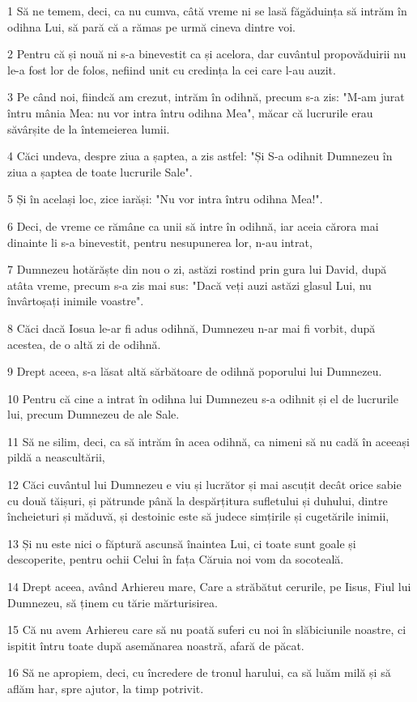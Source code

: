 \par 1 Să ne temem, deci, ca nu cumva, câtă vreme ni se lasă făgăduința să intrăm în odihna Lui, să pară că a rămas pe urmă cineva dintre voi.
\par 2 Pentru că și nouă ni s-a binevestit ca și acelora, dar cuvântul propovăduirii nu le-a fost lor de folos, nefiind unit cu credința la cei care l-au auzit.
\par 3 Pe când noi, fiindcă am crezut, intrăm în odihnă, precum s-a zis: "M-am jurat întru mânia Mea: nu vor intra întru odihna Mea", măcar că lucrurile erau săvârșite de la întemeierea lumii.
\par 4 Căci undeva, despre ziua a șaptea, a zis astfel: "Și S-a odihnit Dumnezeu în ziua a șaptea de toate lucrurile Sale".
\par 5 Și în același loc, zice iarăși: "Nu vor intra întru odihna Mea!".
\par 6 Deci, de vreme ce rămâne ca unii să intre în odihnă, iar aceia cărora mai dinainte li s-a binevestit, pentru nesupunerea lor, n-au intrat,
\par 7 Dumnezeu hotărăște din nou o zi, astăzi rostind prin gura lui David, după atâta vreme, precum s-a zis mai sus: "Dacă veți auzi astăzi glasul Lui, nu învârtoșați inimile voastre".
\par 8 Căci dacă Iosua le-ar fi adus odihnă, Dumnezeu n-ar mai fi vorbit, după acestea, de o altă zi de odihnă.
\par 9 Drept aceea, s-a lăsat altă sărbătoare de odihnă poporului lui Dumnezeu.
\par 10 Pentru că cine a intrat în odihna lui Dumnezeu s-a odihnit și el de lucrurile lui, precum Dumnezeu de ale Sale.
\par 11 Să ne silim, deci, ca să intrăm în acea odihnă, ca nimeni să nu cadă în aceeași pildă a neascultării,
\par 12 Căci cuvântul lui Dumnezeu e viu și lucrător și mai ascuțit decât orice sabie cu două tăișuri, și pătrunde până la despărțitura sufletului și duhului, dintre încheieturi și măduvă, și destoinic este să judece simțirile și cugetările inimii,
\par 13 Și nu este nici o făptură ascunsă înaintea Lui, ci toate sunt goale și descoperite, pentru ochii Celui în fața Căruia noi vom da socoteală.
\par 14 Drept aceea, având Arhiereu mare, Care a străbătut cerurile, pe Iisus, Fiul lui Dumnezeu, să ținem cu tărie mărturisirea.
\par 15 Că nu avem Arhiereu care să nu poată suferi cu noi în slăbiciunile noastre, ci ispitit întru toate după asemănarea noastră, afară de păcat.
\par 16 Să ne apropiem, deci, cu încredere de tronul harului, ca să luăm milă și să aflăm har, spre ajutor, la timp potrivit.

